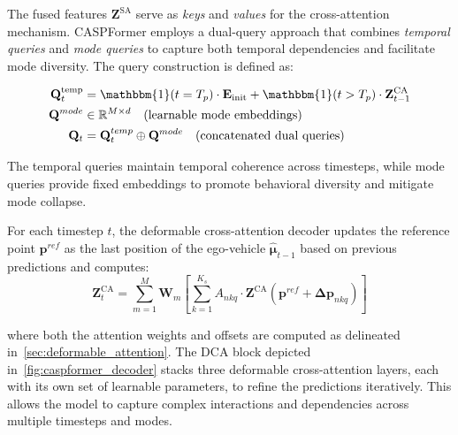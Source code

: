 \begin{description}[leftmargin=1em,itemsep=2pt]
\begin{description}[leftmargin=1em,itemsep=2pt]
\item[Recurrent Deformable Cross-Attention.] The fused features \(\mathbf{Z}^{\text{SA}}\) serve as \emph{keys} and \emph{values} for the cross-attention mechanism. CASPFormer employs a dual-query approach that combines \emph{temporal queries} and \emph{mode queries} to capture both temporal dependencies and facilitate mode diversity. The query construction is defined as:

\begin{equation}
\label{eq:dual_query_construction}
\begin{aligned}
\mathbf{Q}_t^{\text{temp}} &= \mathbbm{1}(t=T_p) \cdot \mathbf{E}_{\text{init}} + \mathbbm{1}(t>T_p) \cdot \mathbf{Z}^{\text{CA}}_{t-1} \\
\mathbf{Q}^{mode} &\in \R^{M \times d} \quad \text{(learnable mode embeddings)} \\
\mathbf{Q}_t &= \mathbf{Q}_t^{temp} \oplus \mathbf{Q}^{mode} \quad \text{(concatenated dual queries)}
\end{aligned}
\end{equation}

The temporal queries maintain temporal coherence across timesteps, while mode queries provide fixed embeddings to promote behavioral diversity and mitigate mode collapse.

For each timestep \(t\), the deformable cross-attention decoder updates the reference point \(\mathbf{p}^{ref}\) as the last position of the ego-vehicle \( \hat{\boldsymbol{\mu}}_{t-1}\) based on previous predictions and computes:
\begin{equation}
\label{eq:cross_attention_operation}
\mathbf{Z}^{\text{CA}}_t = \sum_{m=1}^{M} \mathbf{W}_m \left[ \sum_{k=1}^{K_s} A_{nkq} \cdot \mathbf{Z}^{\text{CA}}(\mathbf{p}^{ref} + \boldsymbol{\Delta p}_{nkq}) \right]
\end{equation}

where both the attention weights and offsets are computed as delineated in~\autoref{sec:deformable_attention}. The DCA block depicted in~\autoref{fig:caspformer_decoder} stacks three deformable cross-attention layers, each with its own set of learnable parameters, to refine the predictions iteratively. This allows the model to capture complex interactions and dependencies across multiple timesteps and modes.


\end{description}
\end{description}
